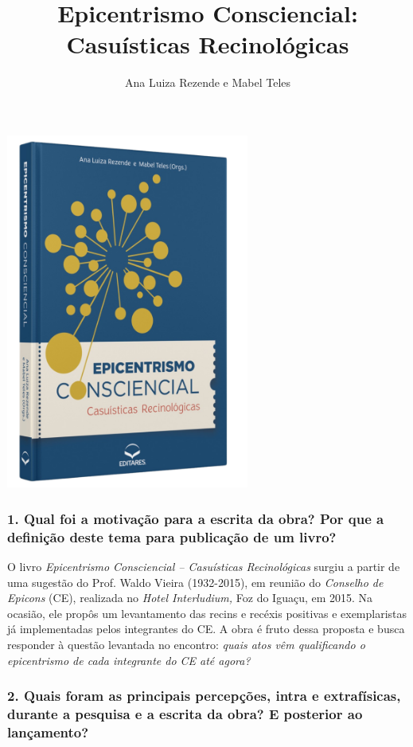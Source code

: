 \documentclass{gescons}
\author{Ana Luiza Rezende e Mabel Teles}
\title{Epicentrismo Consciencial: Casuísticas Recinológicas}
\begin{document}
    \makeentrevistatitle

    \begin{multicols}{2}


\begin{center}
    \includegraphics[width=8cm]{articles/entrevista/mockups/Mabel-e-Ana-Luiza.png}
\end{center}

\subsubsection{1. Qual foi a motivação para a escrita da obra? Por que a definição deste tema para publicação de um livro?}


O livro \textit{Epicentrismo Consciencial – Casuísticas Recinológicas} surgiu a partir de uma sugestão do Prof. Waldo Vieira (1932-2015), em reunião do \textit{Conselho de Epicons} (CE), realizada no \textit{Hotel Interludium,} Foz do Iguaçu, em 2015. Na ocasião, ele propôs um levantamento das recins e recéxis positivas e exemplaristas já implementadas pelos integrantes do CE. A obra é fruto dessa proposta e busca responder à questão levantada no encontro: \textit{quais atos vêm qualificando o epicentrismo de cada integrante do CE até agora? }

\subsubsection{2. Quais foram as principais percepções, intra e extrafísicas, durante a pesquisa e a escrita da obra? E posterior ao lançamento?}


\end{multicols}
\end{document}
